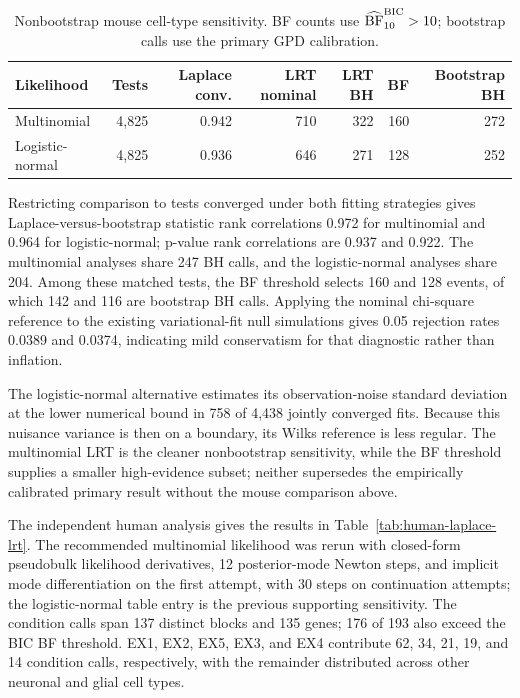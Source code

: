 \documentclass[11pt]{article}
\begin{document}
\begin{table}[H]
\centering
\scriptsize
\caption{Nonbootstrap mouse cell-type sensitivity. BF counts use \(\widehat{\mathrm{BF}}_{10}^{\rm BIC}>10\); bootstrap calls use the primary GPD calibration.}
\label{tab:laplace-lrt-sensitivity}
\begin{tabular}{lrrrrrr}
\toprule
Likelihood & Tests & Laplace conv. & LRT nominal & LRT BH & BF & Bootstrap BH\\
\midrule
Multinomial & 4,825 & 0.942 & 710 & 322 & 160 & 272\\
Logistic-normal & 4,825 & 0.936 & 646 & 271 & 128 & 252\\
\bottomrule
\end{tabular}
\end{table}

Restricting comparison to tests converged under both fitting strategies gives Laplace-versus-bootstrap statistic rank correlations 0.972 for multinomial and 0.964 for logistic-normal; p-value rank correlations are 0.937 and 0.922. The multinomial analyses share 247 BH calls, and the logistic-normal analyses share 204. Among these matched tests, the BF threshold selects 160 and 128 events, of which 142 and 116 are bootstrap BH calls. Applying the nominal chi-square reference to the existing variational-fit null simulations gives 0.05 rejection rates 0.0389 and 0.0374, indicating mild conservatism for that diagnostic rather than inflation.

The logistic-normal alternative estimates its observation-noise standard deviation at the lower numerical bound in 758 of 4,438 jointly converged fits. Because this nuisance variance is then on a boundary, its Wilks reference is less regular. The multinomial LRT is the cleaner nonbootstrap sensitivity, while the BF threshold supplies a smaller high-evidence subset; neither supersedes the empirically calibrated primary result without the mouse comparison above.

The independent human analysis gives the results in Table~\ref{tab:human-laplace-lrt}. The recommended multinomial likelihood was rerun with closed-form pseudobulk likelihood derivatives, 12 posterior-mode Newton steps, and implicit mode differentiation on the first attempt, with 30 steps on continuation attempts; the logistic-normal table entry is the previous supporting sensitivity. The condition calls span 137 distinct blocks and 135 genes; 176 of 193 also exceed the BIC BF threshold. EX1, EX2, EX5, EX3, and EX4 contribute 62, 34, 21, 19, and 14 condition calls, respectively, with the remainder distributed across other neuronal and glial cell types.
\end{document}
